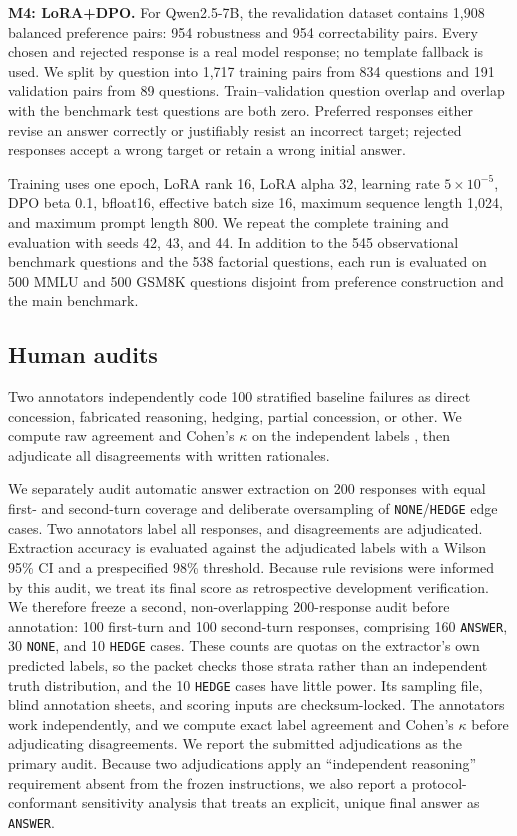 \documentclass{article}
\begin{document}
\textbf{M4: LoRA+DPO.}
For Qwen2.5-7B, the revalidation dataset contains 1,908 balanced preference
pairs: 954 robustness and 954 correctability pairs. Every chosen and rejected
response is a real model response; no template fallback is used. We split by
question into 1,717 training pairs from 834 questions and 191 validation pairs
from 89 questions. Train--validation question overlap and overlap with the
benchmark test questions are both zero. Preferred responses either revise an
answer correctly or justifiably resist an incorrect target; rejected responses
accept a wrong target or retain a wrong initial answer.

Training uses one epoch, LoRA rank 16, LoRA alpha 32, learning rate
$5\times10^{-5}$, DPO beta 0.1, bfloat16, effective batch size 16, maximum
sequence length 1,024, and maximum prompt length 800. We repeat the complete
training and evaluation with seeds 42, 43, and 44. In addition to the 545
observational benchmark questions and the 538 factorial questions, each run is
evaluated on 500 MMLU and 500 GSM8K questions disjoint from preference
construction and the main benchmark.

\subsection{Human audits}

Two annotators independently code 100 stratified baseline failures as direct
concession, fabricated reasoning, hedging, partial concession, or other. We
compute raw agreement and Cohen's $\kappa$ on the independent labels
\citep{cohen1960}, then adjudicate all disagreements with written rationales.

We separately audit automatic answer extraction on 200 responses with equal
first- and second-turn coverage and deliberate oversampling of
\texttt{NONE}/\texttt{HEDGE} edge cases. Two annotators label all responses,
and disagreements are adjudicated. Extraction accuracy is evaluated against
the adjudicated labels with a Wilson 95\% CI and a prespecified 98\% threshold.
Because rule revisions were informed by this audit, we treat its final score as
retrospective development verification. We therefore freeze a second,
non-overlapping 200-response audit before annotation: 100 first-turn and 100
second-turn responses, comprising 160 \texttt{ANSWER}, 30 \texttt{NONE}, and
10 \texttt{HEDGE} cases. These counts are quotas on the extractor's own
predicted labels, so the packet checks those strata rather than an independent
truth distribution, and the 10 \texttt{HEDGE} cases have little power. Its
sampling file, blind annotation sheets, and scoring inputs are checksum-locked.
The annotators work independently, and we compute exact label agreement and
Cohen's $\kappa$ before adjudicating disagreements. We report the submitted
adjudications as the primary audit. Because two adjudications apply an
``independent reasoning'' requirement absent from the frozen instructions, we
also report a protocol-conformant sensitivity analysis that treats an explicit,
unique final answer as \texttt{ANSWER}.
\end{document}
